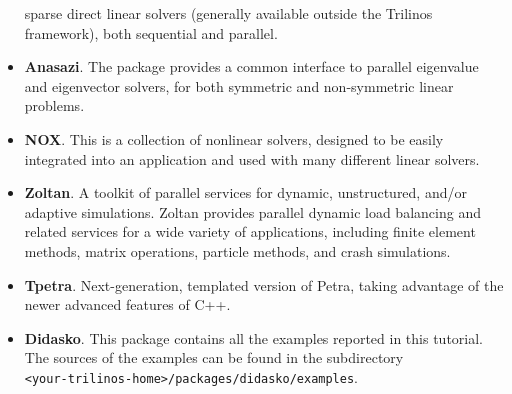 \begin{itemize}
  sparse direct linear solvers (generally available outside the Trilinos
  framework), both sequential and parallel.
\item {\bf Anasazi}. The package provides a common interface to parallel eigenvalue
  and eigenvector solvers, for both symmetric and non-symmetric linear problems.
\item {\bf NOX}. This is a collection of nonlinear solvers, designed to
  be easily integrated into an application and used with many different
  linear solvers.
\item {\bf Zoltan}. A toolkit of parallel services for dynamic, unstructured,
and/or adaptive simulations. Zoltan provides parallel dynamic load balancing
and related services for a wide variety of applications, including finite
element methods, matrix operations, particle methods, and crash simulations. 
\item {\bf Tpetra}. Next-generation, templated version of Petra, taking
advantage of the newer advanced features of C++. 
\item {\bf Didasko}. This package contains all the examples reported in this
tutorial. The sources of the examples can be found in the subdirectory\\
\verb!<your-trilinos-home>/packages/didasko/examples!.
\end{itemize}

